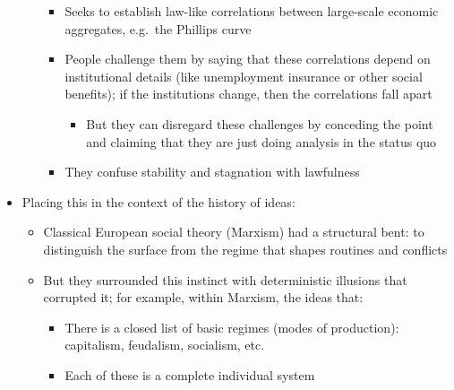 \begin{itemize}
\begin{enumerate}
    \begin{itemize}
    \tightlist
    \item
      Seeks to establish law-like correlations between large-scale
      economic aggregates, e.g.~the Phillips curve
    \item
      People challenge them by saying that these correlations depend on
      institutional details (like unemployment insurance or other social
      benefits); if the institutions change, then the correlations fall
      apart

      \begin{itemize}
      \tightlist
      \item
        But they can disregard these challenges by conceding the point
        and claiming that they are just doing analysis in the status quo
      \end{itemize}
    \item
      They confuse stability and stagnation with lawfulness
    \end{itemize}
  \end{enumerate}
\item
  Placing this in the context of the history of ideas:

  \begin{itemize}
  \tightlist
  \item
    Classical European social theory (Marxism) had a structural bent: to
    distinguish the surface from the regime that shapes routines and
    conflicts
  \item
    But they surrounded this instinct with deterministic illusions that
    corrupted it; for example, within Marxism, the ideas that:

    \begin{itemize}
    \tightlist
    \item
      There is a closed list of basic regimes (modes of production):
      capitalism, feudalism, socialism, etc.
    \item
      Each of these is a complete individual system


\end{itemize}
\end{itemize}
\end{itemize}
